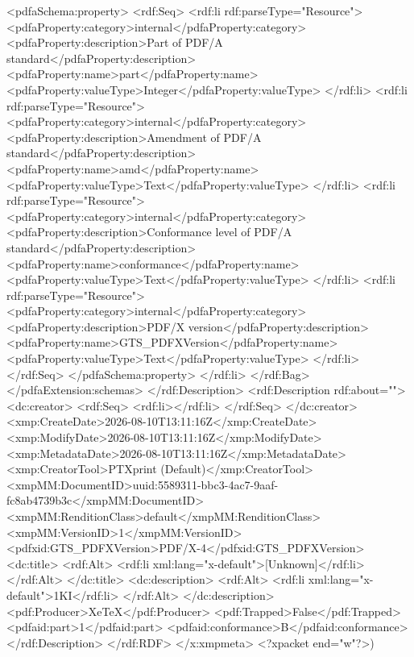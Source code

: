 {              <pdfaSchema:property>
                <rdf:Seq>
                  <rdf:li rdf:parseType="Resource">
                    <pdfaProperty:category>internal</pdfaProperty:category>
                    <pdfaProperty:description>Part of PDF/A standard</pdfaProperty:description>
                    <pdfaProperty:name>part</pdfaProperty:name>
                    <pdfaProperty:valueType>Integer</pdfaProperty:valueType>
                  </rdf:li>
                  <rdf:li rdf:parseType="Resource">
                    <pdfaProperty:category>internal</pdfaProperty:category>
                    <pdfaProperty:description>Amendment of PDF/A standard</pdfaProperty:description>
                    <pdfaProperty:name>amd</pdfaProperty:name>
                    <pdfaProperty:valueType>Text</pdfaProperty:valueType>
                  </rdf:li>
                  <rdf:li rdf:parseType="Resource">
                    <pdfaProperty:category>internal</pdfaProperty:category>
                    <pdfaProperty:description>Conformance level of PDF/A standard</pdfaProperty:description>
                    <pdfaProperty:name>conformance</pdfaProperty:name>
                    <pdfaProperty:valueType>Text</pdfaProperty:valueType>
                  </rdf:li>
                  <rdf:li rdf:parseType="Resource">
                    <pdfaProperty:category>internal</pdfaProperty:category>
                    <pdfaProperty:description>PDF/X version</pdfaProperty:description>
                    <pdfaProperty:name>GTS_PDFXVersion</pdfaProperty:name>
                    <pdfaProperty:valueType>Text</pdfaProperty:valueType>
                  </rdf:li>
                </rdf:Seq>
              </pdfaSchema:property>
            </rdf:li>
          </rdf:Bag>
        </pdfaExtension:schemas>
      </rdf:Description>
      <rdf:Description rdf:about="">
        <dc:creator>
          <rdf:Seq>
            <rdf:li></rdf:li>
          </rdf:Seq>
        </dc:creator>
        <xmp:CreateDate>2026-08-10T13:11:16Z</xmp:CreateDate>
        <xmp:ModifyDate>2026-08-10T13:11:16Z</xmp:ModifyDate>
        <xmp:MetadataDate>2026-08-10T13:11:16Z</xmp:MetadataDate>
        <xmp:CreatorTool>PTXprint (Default)</xmp:CreatorTool>
        <xmpMM:DocumentID>uuid:5589311-bbc3-4ac7-9aaf-fc8ab4739b3c</xmpMM:DocumentID>
        <xmpMM:RenditionClass>default</xmpMM:RenditionClass>
        <xmpMM:VersionID>1</xmpMM:VersionID>
        <pdfxid:GTS_PDFXVersion>PDF/X-4</pdfxid:GTS_PDFXVersion>
        <dc:title>
          <rdf:Alt>
            <rdf:li xml:lang="x-default">[Unknown]</rdf:li>
          </rdf:Alt>
        </dc:title>
        <dc:description>
          <rdf:Alt>
            <rdf:li xml:lang="x-default">1KI</rdf:li>
          </rdf:Alt>
        </dc:description>
        <pdf:Producer>XeTeX</pdf:Producer>
        <pdf:Trapped>False</pdf:Trapped>
      <pdfaid:part>1</pdfaid:part>
      <pdfaid:conformance>B</pdfaid:conformance>
      </rdf:Description>
  </rdf:RDF>
</x:xmpmeta>
<?xpacket end="w"?>)}

